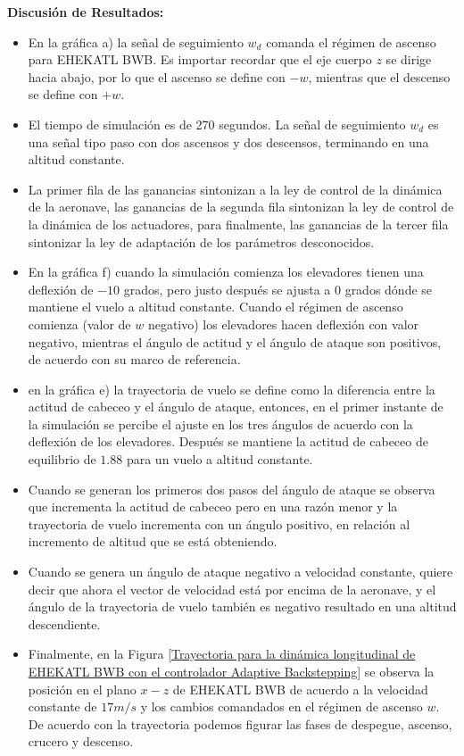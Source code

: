 \textbf{Discusión de Resultados:}
\begin{itemize}
    \item En la gráfica a) la señal de seguimiento $w_d$ comanda el régimen de ascenso para EHEKATL BWB. Es importar recordar que el eje cuerpo $z$ se dirige hacia abajo, por lo que el ascenso se define con $-w$, mientras que el descenso se define con $+w$. 
    \item El tiempo de simulación es de 270 segundos. La señal de seguimiento $w_d$ es una señal tipo paso con dos ascensos y dos descensos, terminando en una altitud constante.
    \item La primer fila de las ganancias sintonizan a la ley de control de la dinámica de la aeronave, las ganancias de la segunda fila sintonizan la ley de control de la dinámica de los actuadores, para finalmente, las ganancias de la tercer fila sintonizar la ley de adaptación de los parámetros desconocidos.
    \item En la gráfica f) cuando la simulación comienza los elevadores tienen una deflexión de $-10$ grados, pero justo después se ajusta a $0$ grados dónde se mantiene el vuelo a altitud constante. 
    Cuando el régimen de ascenso comienza (valor de $w$ negativo) los elevadores hacen deflexión con valor negativo, mientras el ángulo de actitud y el ángulo de ataque son positivos, de acuerdo con su marco de referencia. 
    \item en la gráfica e) la trayectoria de vuelo se define como la diferencia entre la actitud de cabeceo y el ángulo de ataque, entonces, en el primer instante de la simulación se percibe el ajuste en los tres ángulos de acuerdo con la deflexión de los elevadores. Después se mantiene la actitud de cabeceo de equilibrio de $1.88$ para un vuelo a altitud constante. 
    \item Cuando se generan los primeros dos pasos del ángulo de ataque se observa que incrementa la actitud de cabeceo pero en una razón menor y la trayectoria de vuelo incrementa con un ángulo positivo, en relación al incremento de altitud que se está obteniendo. 
    \item Cuando se genera un ángulo de ataque negativo a velocidad constante, quiere decir que ahora el vector de velocidad está por encima de la aeronave, y el ángulo de la trayectoria de vuelo también es negativo resultado en una altitud descendiente. 
    \item Finalmente, en la Figura \ref{Trayectoria para la dinámica longitudinal de EHEKATL BWB con el controlador Adaptive Backstepping} se observa la posición en el plano $x-z$ de EHEKATL BWB de acuerdo a la velocidad constante de $17 m/s$ y los cambios comandados en el régimen de ascenso $w$. De acuerdo con la trayectoria podemos figurar las fases de despegue, ascenso, crucero y descenso. 
\end{itemize}

